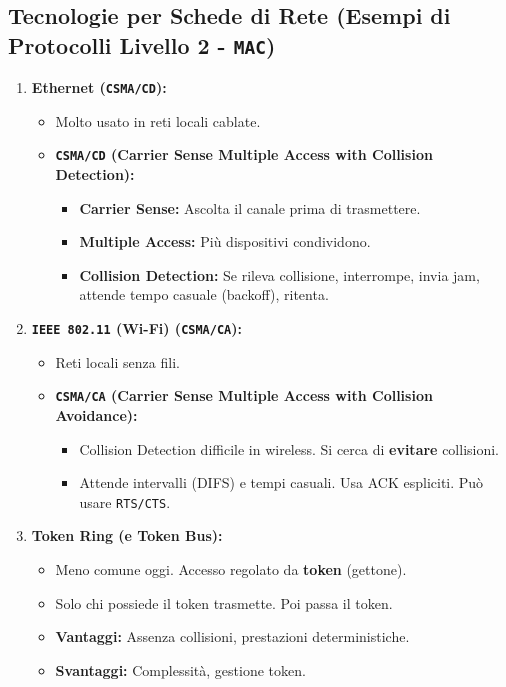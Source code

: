 \subsection{Tecnologie per Schede di Rete (Esempi di Protocolli Livello 2 - \texttt{MAC})}
\begin{enumerate}
    \item \textbf{Ethernet (\texttt{CSMA/CD}):}
    \begin{itemize}
        \item Molto usato in reti locali cablate.
        \item \textbf{\texttt{CSMA/CD} (Carrier Sense Multiple Access with Collision Detection):}
        \begin{itemize}
            \item \textbf{Carrier Sense:} Ascolta il canale prima di trasmettere.
            \item \textbf{Multiple Access:} Più dispositivi condividono.
            \item \textbf{Collision Detection:} Se rileva collisione, interrompe, invia jam, attende tempo casuale (backoff), ritenta.
        \end{itemize}
    \end{itemize}
    \item \textbf{\texttt{IEEE 802.11} (Wi-Fi) (\texttt{CSMA/CA}):}
    \begin{itemize}
        \item Reti locali senza fili.
        \item \textbf{\texttt{CSMA/CA} (Carrier Sense Multiple Access with Collision Avoidance):}
        \begin{itemize}
            \item Collision Detection difficile in wireless. Si cerca di \textbf{evitare} collisioni.
            \item Attende intervalli (DIFS) e tempi casuali. Usa ACK espliciti. Può usare \texttt{RTS/CTS}.
        \end{itemize}
    \end{itemize}
    \item \textbf{Token Ring (e Token Bus):}
    \begin{itemize}
        \item Meno comune oggi. Accesso regolato da \textbf{token} (gettone).
        \item Solo chi possiede il token trasmette. Poi passa il token.
        \item \textbf{Vantaggi:} Assenza collisioni, prestazioni deterministiche.
        \item \textbf{Svantaggi:} Complessità, gestione token.
    \end{itemize}
\end{enumerate}

